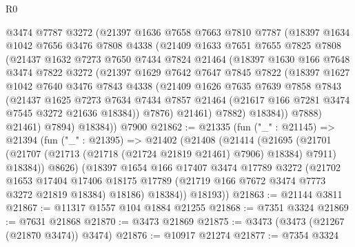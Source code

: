 \begin{lexlean}{R0}
\begin{coremodule}
        @3474
        @7787
        @3272
        (@21397
          @1636
          @7658
          @7663
          @7810
          @7787
          (@18397
            @1634
            @1042
            @7656
            @3476
            @7808
            @4338
            (@21409
              @1633
              @7651
              @7655
              @7825
              @7808
              (@21437
                @1632
                @7273
                @7650
                @7434
                @7824
                @21464
                (@18397
                  @1630
                  @166
                  @7648
                  @3474
                  @7822
                  @3272
                  (@21397
                    @1629
                    @7642
                    @7647
                    @7845
                    @7822
                    (@18397
                      @1627
                      @1042
                      @7640
                      @3476
                      @7843
                      @4338
                      (@21409
                        @1626
                        @7635
                        @7639
                        @7858
                        @7843
                        (@21437
                          @1625
                          @7273
                          @7634
                          @7434
                          @7857
                          @21464
                          (@21617 @166 @7281 @3474 @7545 @3272 @21636 @18384))
                        @7876)
                      @21461)
                    @7882)
                  @18384))
              @7888)
            @21461)
          @7894)
        @18384))
    @7900
@21862 := @21335
    (fun ("_" : @21145) =>
    @21394
      (fun ("_" : @21395) =>
      @21402
        (@21408
          (@21414
            (@21695
              (@21701 (@21707 (@21713 (@21718 (@21724 @21819 @21461) @7906) @18384) @7911) @18384))
            @8626)
          (@18397
            @1654
            @166
            @17407
            @3474
            @17789
            @3272
            (@21702
              @1653
              @17404
              @17406
              @18175
              @17789
              (@21719 @166 @7672 @3474 @7773 @3272 @21819 @18384)
              @18186)
            @18384))
        @18193))
@21863 := @21144 @3811
@21867 := @11317 @1557 @104 @1884 @21255
@21868 := @7351 @3324
@21869 := @7631 @21868
@21870 := @3473 @21869
@21875 := @3473 (@3473 (@21267 (@21870 @3474)) @3474)
@21876 := @10917 @21274
@21877 := @7354 @3324

\end{coremodule}
\end{lexlean}
